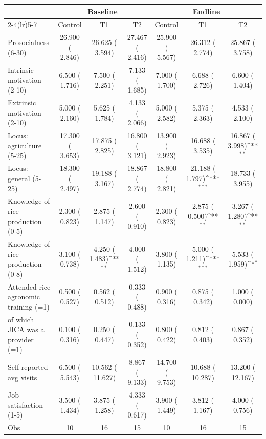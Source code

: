 \def\sym#1{\ifmmode^{#1}\else\(^{#1}\)\fi}
\begin{tabular}{lcccccc}
\toprule
 & \multicolumn{3}{c}{Baseline} & \multicolumn{3}{c}{Endline} \\
\cmidrule(lr){2-4}\cmidrule(lr){5-7}
 & Control & T1 & T2 & Control & T1 & T2 \\
\midrule
Prosocialness (6-30) &    26.900 (    2.846) &    26.625 (    3.594) &    27.467 (    2.416) &    25.900 (    5.567) &    26.312 (    2.774) &    25.867 (    3.758) \\
Intrinsic motivation (2-10) &     6.500 (    1.716) &     7.500 (    2.251) &     7.133 (    1.685) &     7.000 (    1.700) &     6.688 (    2.726) &     6.600 (    1.404) \\
Extrinsic motivation (2-10) &     5.000 (    2.160) &     5.625 (    1.784) &     4.133 (    2.066) &     5.000 (    2.582) &     5.375 (    2.363) &     4.533 (    2.100) \\
Locus: agriculture (5-25) &    17.300 (    3.653) &    17.875 (    2.825) &    16.800 (    3.121) &    13.900 (    2.923) &    16.688 (    3.535) &    16.867 (    3.998)\sym{**} \\
Locus: general (5-25) &    18.300 (    2.497) &    19.188 (    3.167) &    18.867 (    2.774) &    18.800 (    2.821) &    21.188 (    1.797)\sym{***} &    18.733 (    3.955) \\
\midrule
Knowledge of rice production (0-5) &     2.300 (    0.823) &     2.875 (    1.147) &     2.600 (    0.910) &     2.300 (    0.823) &     2.875 (    0.500)\sym{**} &     3.267 (    1.280)\sym{**} \\
Knowledge of rice production (0-8) &     3.100 (    0.738) &     4.250 (    1.483)\sym{**} &     4.000 (    1.512) &     3.800 (    1.135) &     5.000 (    1.211)\sym{***} &     5.533 (    1.959)\sym{*} \\
Attended rice agronomic training (=1) &     0.500 (    0.527) &     0.562 (    0.512) &     0.333 (    0.488) &     0.900 (    0.316) &     0.875 (    0.342) &     1.000 (    0.000) \\
\quad of which JICA was a provider (=1) &     0.100 (    0.316) &     0.250 (    0.447) &     0.133 (    0.352) &     0.800 (    0.422) &     0.812 (    0.403) &     0.867 (    0.352) \\
Self-reported avg visits &     6.500 (    5.543) &    10.562 (   11.627) &     8.867 (    9.133) &    14.700 (    9.753) &    10.688 (   10.287) &    13.200 (   12.167) \\
Job satisfaction (1-5) &     3.500 (    1.434) &     3.875 (    1.258) &     4.333 (    0.617) &     3.900 (    1.449) &     3.812 (    1.167) &     4.000 (    0.756) \\
\midrule
Obs &        10 &        16 &        15 &        10 &        16 &        15 \\
\bottomrule
\end{tabular}
